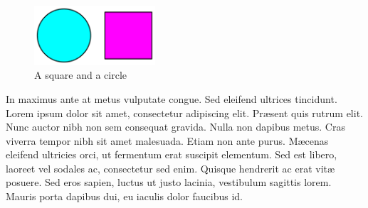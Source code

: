 \begin{figure}
  \centering
  \includegraphics[width=0.4\textwidth]{fig/square-circle}
  \caption{A square and a circle}
  \label{fig:square-circle}
\end{figure}

In maximus ante at metus vulputate congue. Sed eleifend ultrices tincidunt. Lorem ipsum dolor sit amet, consectetur adipiscing elit. Pr\ae{}sent quis rutrum elit. Nunc auctor nibh non sem consequat gravida. Nulla non dapibus metus. Cras viverra tempor nibh sit amet malesuada. Etiam non ante purus. M\ae{}cenas eleifend ultricies orci, ut fermentum erat suscipit elementum. Sed est libero, laoreet vel sodales ac, consectetur sed enim. Quisque hendrerit ac erat vit\ae{} posuere. Sed eros sapien, luctus ut justo lacinia, vestibulum sagittis lorem. Mauris porta dapibus dui, eu iaculis dolor faucibus id. 


%
%




